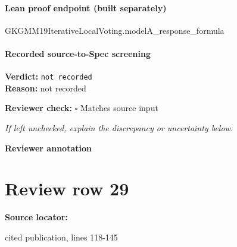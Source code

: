 \documentclass[10pt]{article}
\newcommand{\reviewerbox}{%
  \par\noindent\fbox{\parbox{0.96\linewidth}{\rule{0pt}{0.38in}}}\par
}
\newcommand{\reviewmatch}[1]{%
  \par\noindent\textbf{Reviewer check:} $\square$\; #1\par
  \noindent\emph{If left unchecked, explain the discrepancy or uncertainty below.}\par
}
\begin{document}
\paragraph{Lean proof endpoint (built separately)}\begin{ReviewVerbatim}
GKGMM19IterativeLocalVoting.modelA_response_formula
\end{ReviewVerbatim}

\paragraph{Recorded source-to-Spec screening}
\textbf{Verdict:} \texttt{not recorded}
\\
\textbf{Reason:} not recorded
\reviewmatch{Matches source input}
\noindent\textbf{Reviewer annotation}\par
\reviewerbox
\clearpage
\hypertarget{source-claim-2415911cc7314d54}{}
\section*{Review row 29}
\textbf{Source locator:} {\footnotesize\raggedright cited publication, lines 118-\allowbreak{}145\par}
\end{document}
